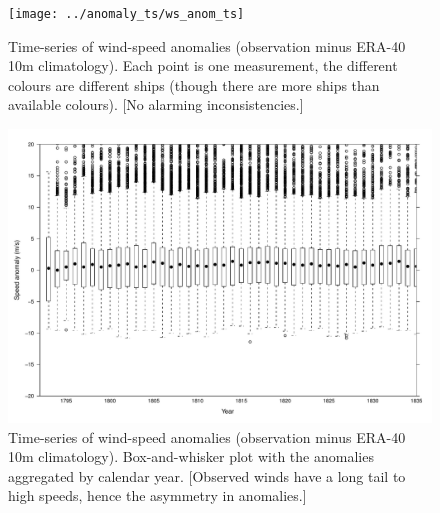 \documentclass[a4paper,11pt]{article}
\begin{document}
\begin{figure}
\begin{center}
\texttt{[image: ../anomaly\_ts/ws\_anom\_ts]}
\caption{Time-series of wind-speed anomalies (observation minus ERA-40 10m climatology). Each point is one measurement, the different colours are different ships (though there are more ships than available colours). [No alarming inconsistencies.]}
\label{ws_anom_ts}
\end{center}
\end{figure}

\begin{figure}
\begin{center}
\includegraphics[angle=0, width=1.0\textwidth]{../anomaly_ts/ws_anom_bwplot}
\caption{Time-series of wind-speed anomalies (observation minus ERA-40 10m climatology). Box-and-whisker plot with the anomalies aggregated by calendar year. [Observed winds have a long tail to high speeds, hence the asymmetry in anomalies.]}
\label{ws_anom_bwplot}
\end{center}
\end{figure}
\end{document}
